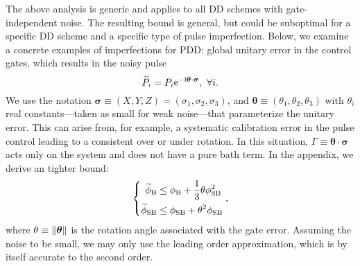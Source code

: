\documentclass[pra,reprint,superscriptaddress]{revtex4-2}
\begin{document}
The above analysis is generic and applies to all DD schemes with gate-independent noise. 
The resulting bound is general, but could be suboptimal for a specific DD scheme and a specific type of pulse imperfection. Below, we examine a concrete examples of imperfections  for PDD: 
global unitary error in the control gates,  which results in the noisy pulse 
\begin{equation}
\widetilde P_i=P_i\mathrm{e}^{-\mathrm{i} \bm{\theta}\cdot\bm\sigma},\ \forall i.
\end{equation}
We use the notation $\bm\sigma\equiv (X,Y,Z)=(\sigma_1,\sigma_2,\sigma_3)$, and $\bm\theta\equiv (\theta_1,\theta_2,\theta_3)$ with $\theta_i$ real constants---taken as small for weak noise---that parameterize the unitary error.  This can arise from, for example, a systematic calibration error in the pulse control leading to a consistent over or under rotation.   In this situation, $\Gamma\equiv \bm\theta\cdot\bm\sigma$ acts only on the system and does not have a pure bath term. In the appendix, we derive an tighter bound:
\begin{equation}\label{eq:eff-Hami-tcp}
\left\{
\begin{aligned}
\widetilde{\phi}_{\mathrm{B}} &\le \phi_{\mathrm{B}} + \frac{1}{3}\theta  \phi^2_{\mathrm{SB}}  \\
\widetilde{\phi}_{\mathrm{SB}} &\le \phi_{\mathrm{SB}} +  \theta^2  \phi_{\mathrm{SB}}  \\
\end{aligned}    \right.,
\end{equation}
where $\theta \equiv \Vert {\bm \theta} \Vert$ is the rotation angle associated with the gate error.
Assuming the noise to be small, we may only use the leading order 
approximation, which is by itself accurate to the second order. 
\end{document}
